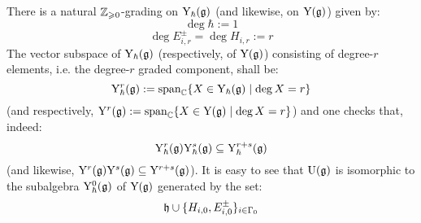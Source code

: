             \begin{remark} \label{remark: the_degree_grading_on_yangians}
                There is a natural $\mathbb{Z}_{\geqslant 0}$-grading on $\mathrm{Y}_{\hbar}(\mathfrak{g})$ (and likewise, on $\mathrm{Y}(\mathfrak{g})$) given by:
                    $$\deg \hbar := 1$$
                    $$\deg E_{i, r}^{\pm} = \deg H_{i, r} := r$$
                The vector subspace of $\mathrm{Y}_{\hbar}(\mathfrak{g})$ (respectively, of $\mathrm{Y}(\mathfrak{g})$) consisting of degree-$r$ elements, i.e. the degree-$r$ graded component, shall be:
                    $$\mathrm{Y}^r_{\hbar}(\mathfrak{g}) := \operatorname{span}_{\mathbb{C}} \{ X \in \mathrm{Y}_{\hbar}(\mathfrak{g}) \mid \deg X = r \}$$
                (and respectively, $\mathrm{Y}^r(\mathfrak{g}) := \operatorname{span}_{\mathbb{C}} \{ X \in \mathrm{Y}(\mathfrak{g}) \mid \deg X = r \}$) and one checks that, indeed:
                    $$\mathrm{Y}^r_{\hbar}(\mathfrak{g}) \mathrm{Y}^s_{\hbar}(\mathfrak{g}) \subseteq \mathrm{Y}^{r + s}_{\hbar}(\mathfrak{g})$$
                (and likewise, $\mathrm{Y}^r(\mathfrak{g}) \mathrm{Y}^s(\mathfrak{g}) \subseteq \mathrm{Y}^{r + s}(\mathfrak{g})$). It is easy to see that $\mathrm{U}(\mathfrak{g})$ is isomorphic to the subalgebra $\mathrm{Y}^0_{\hbar}(\mathfrak{g})$ of $\mathrm{Y}(\mathfrak{g})$ generated by the set:
                    $$\mathfrak{h} \cup \{ H_{i, 0}, E_{i, 0}^{\pm} \}_{i \in \Gamma_0}$$
            \end{remark}
            
